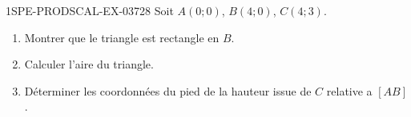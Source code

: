 \begin{exercice}{1SPE-PRODSCAL-EX-037}{2}{8}
Soit $A(0; 0)$, $B(4; 0)$, $C(4; 3)$.
\begin{enumerate}
  \item Montrer que le triangle est rectangle en $B$.
  \item Calculer l'aire du triangle.
  \item Déterminer les coordonnées du pied de la hauteur issue de $C$ relative a $[AB]$.
\end{enumerate}
\end{exercice}

